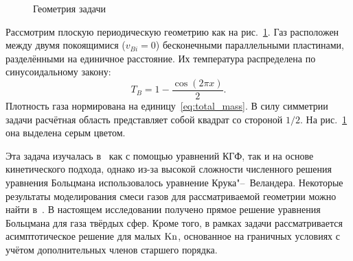 \begin{figure}[ht]
    \centering
    \caption{Геометрия задачи}\label{fig:sone_bobylev}
\end{figure}

Рассмотрим плоскую периодическую геометрию как на рис.~\ref{fig:sone_bobylev}.
Газ расположен между двумя покоящимися (\(v_{Bi} = 0\)) бесконечными параллельными пластинами,
разделёнными на единичное расстояние. Их температура распределена по синусоидальному закону:
\begin{equation}
    T_B = 1 - \frac{\cos(2\pi x)}{2}.
\end{equation}
Плотность газа нормирована на единицу~\eqref{eq:total_mass}.
В силу симметрии задачи расчётная область представляет собой квадрат со стороной \(1/2\).
На рис.~\ref{fig:sone_bobylev} она выделена серым цветом.

Эта задача изучалась в~\cite{Sone1996} как с помощью уравнений КГФ, так и на основе кинетического подхода,
однако из-за высокой сложности численного решения уравнения Больцмана использовалось уравнение Крука"--~Веландера.
Некоторые результаты моделирования смеси газов для рассматриваемой геометрии можно найти в~\cite{Wu2015}.
В настоящем исследовании получено прямое решение уравнения Больцмана для газа твёрдых сфер.
Кроме того, в рамках задачи рассматривается асимптотическое решение для малых \(\mathrm{Kn}\),
основанное на граничных условиях с учётом дополнительных членов старшего порядка.

